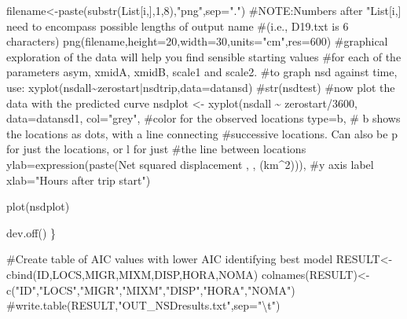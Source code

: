 \documentclass[
  letterpaper,
]{book}
\newenvironment{Shaded}{\begin{snugshade}}{\end{snugshade}}
\newcommand{\AttributeTok}[1]{\textcolor[rgb]{0.40,0.45,0.13}{#1}}
\newcommand{\CommentTok}[1]{\textcolor[rgb]{0.37,0.37,0.37}{#1}}
\newcommand{\DecValTok}[1]{\textcolor[rgb]{0.68,0.00,0.00}{#1}}
\newcommand{\FunctionTok}[1]{\textcolor[rgb]{0.28,0.35,0.67}{#1}}
\newcommand{\NormalTok}[1]{\textcolor[rgb]{0.00,0.23,0.31}{#1}}
\newcommand{\OtherTok}[1]{\textcolor[rgb]{0.00,0.23,0.31}{#1}}
\newcommand{\SpecialCharTok}[1]{\textcolor[rgb]{0.37,0.37,0.37}{#1}}
\newcommand{\StringTok}[1]{\textcolor[rgb]{0.13,0.47,0.30}{#1}}
\begin{document}
\begin{Shaded}
\begin{Highlighting}[]
\NormalTok{filename}\OtherTok{\textless{}{-}}\FunctionTok{paste}\NormalTok{(}\FunctionTok{substr}\NormalTok{(List[i,],}\DecValTok{1}\NormalTok{,}\DecValTok{8}\NormalTok{),}\StringTok{"png"}\NormalTok{,}\AttributeTok{sep=}\StringTok{"."}\NormalTok{)}
\CommentTok{\#NOTE:Numbers after "List[i,] need to encompass possible lengths of output name }
\CommentTok{\#(i.e., D19.txt is 6 characters)}
\FunctionTok{png}\NormalTok{(filename,}\AttributeTok{height=}\DecValTok{20}\NormalTok{,}\AttributeTok{width=}\DecValTok{30}\NormalTok{,}\AttributeTok{units=}\StringTok{"cm"}\NormalTok{,}\AttributeTok{res=}\DecValTok{600}\NormalTok{)}
\CommentTok{\#graphical exploration of the data will help you find sensible starting values }
\CommentTok{\#for each of the parameters asym, xmidA, xmidB, scale1 and scale2. }
\CommentTok{\#to graph nsd against time, use:}
\FunctionTok{xyplot}\NormalTok{(nsdall}\SpecialCharTok{\textasciitilde{}}\NormalTok{zerostart}\SpecialCharTok{|}\NormalTok{nsdtrip,}\AttributeTok{data=}\NormalTok{datansd)}
\CommentTok{\#str(nsdtest)}
\CommentTok{\#now plot the data with the predicted curve  }
\NormalTok{nsdplot }\OtherTok{\textless{}{-}} \FunctionTok{xyplot}\NormalTok{(nsdall }\SpecialCharTok{\textasciitilde{}}\NormalTok{ zerostart}\SpecialCharTok{/}\DecValTok{3600}\NormalTok{, }\AttributeTok{data=}\NormalTok{datansd1,}
\AttributeTok{col=}\StringTok{"grey"}\NormalTok{,    }\CommentTok{\#color for the observed locations}
\AttributeTok{type=}\StringTok{\textquotesingle{}b\textquotesingle{}}\NormalTok{,      }\CommentTok{\# \textquotesingle{}b\textquotesingle{} shows the locations as dots, with a line connecting }
\CommentTok{\#successive locations. Can also be \textquotesingle{}p\textquotesingle{} for just the locations, or \textquotesingle{}l\textquotesingle{} for just }
\CommentTok{\#the line between locations}
\AttributeTok{ylab=}\FunctionTok{expression}\NormalTok{(}\FunctionTok{paste}\NormalTok{(}\StringTok{\textquotesingle{}Net squared displacement \textquotesingle{}}\NormalTok{,}\StringTok{\textquotesingle{} \textquotesingle{}}\NormalTok{, (km}\SpecialCharTok{\^{}}\DecValTok{2}\NormalTok{))), }\CommentTok{\#y axis label}
\AttributeTok{xlab=}\StringTok{"Hours after trip start"}\NormalTok{)}

\FunctionTok{plot}\NormalTok{(nsdplot)}

\FunctionTok{dev.off}\NormalTok{()}
\NormalTok{\}}

\CommentTok{\#Create table of AIC values with lower AIC identifying best model}
\NormalTok{RESULT}\OtherTok{\textless{}{-}}\FunctionTok{cbind}\NormalTok{(ID,LOCS,MIGR,MIXM,DISP,HORA,NOMA)}
\FunctionTok{colnames}\NormalTok{(RESULT)}\OtherTok{\textless{}{-}} \FunctionTok{c}\NormalTok{(}\StringTok{"ID"}\NormalTok{,}\StringTok{"LOCS"}\NormalTok{,}\StringTok{"MIGR"}\NormalTok{,}\StringTok{"MIXM"}\NormalTok{,}\StringTok{"DISP"}\NormalTok{,}\StringTok{"HORA"}\NormalTok{,}\StringTok{"NOMA"}\NormalTok{)}
\CommentTok{\#write.table(RESULT,"OUT\_NSDresults.txt",sep="\textbackslash{}t")}


\end{Highlighting}
\end{Shaded}
\end{document}
